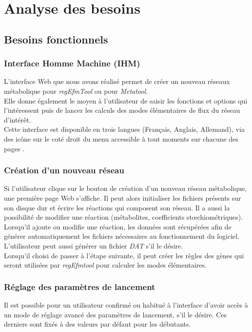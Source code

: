 \section{Analyse des besoins}

\subsection{Besoins fonctionnels}

\subsubsection{Interface Homme Machine (IHM)}
L'interface Web que nous avons réalisé permet de créer un nouveau réseaux métabolique pour \emph{regEfmTool} ou pour \emph{Metatool}.\\
Elle donne également le moyen à l'utilisateur de saisir les fonctions et options qui l'intéressent puis de lancer les calculs des modes élémentaires de flux du réseau d'intérêt.\\ 
Cette interface est disponible en trois langues (Français, Anglais, Allemand), via des icône sur le coté droit du menu accessible à tout moments sur chacune des pages .

\subsubsection{Création d'un nouveau réseau}
Si l'utilisateur clique sur le bouton de création d'un nouveau réseau métabolique, une première page Web s'affiche. Il peut alors initialiser les fichiers présents sur son disque dur et écrire les réactions qui composent son réseau. Il a aussi la possibilité de modifier une réaction (métabolites, coefficients stœchiométriques). Lorsqu'il ajoute ou modifie une réaction, les données sont récupérées afin de générer automatiquement les fichiers nécessaires au fonctionnement du logiciel.
L'utilisateur peut aussi générer un fichier \emph{DAT} s'il le désire.\\
Lorsqu'il choisi de passer à l'étape suivante, il peut créer les règles des gènes qui seront utilisées par \emph{regEfmtool} pour calculer les modes élémentaires.

\subsubsection{Réglage des paramètres de lancement}
Il est possible pour un utilisateur confirmé ou habitué à l'interface d'avoir accès à un mode de réglage avancé des paramètres de lancement, s'il le désire. Ces derniers sont fixés à des valeurs par défaut pour les débutants. 


